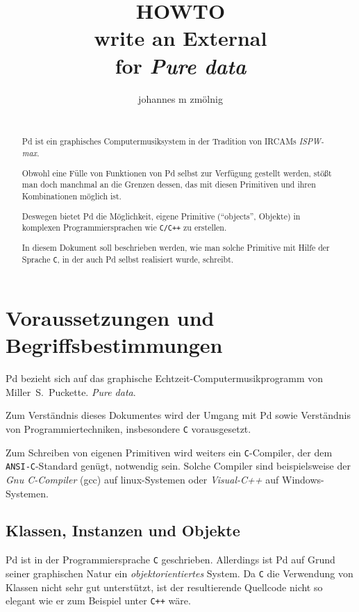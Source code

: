 \documentclass[12pt, a4paper,austrian, titlepage]{article}
\title{
HOWTO \\
write an External \\
for {\em Pure data}
}
\author{
johannes m zmölnig \\
\\
{\em
\latexhtml{institut für elektronische musik und akustik}
{\htmladdnormalink{institut für elektronische musik und akustik}{http://iem.at}}
}
}
\date{}
\begin{document}
\maketitle


\begin{abstract}
Pd ist ein graphisches Computermusiksystem in der Tradition von IRCAMs {\em ISPW-max}.

Obwohl eine Fülle von Funktionen von Pd selbst zur Verfügung gestellt 
werden, stößt man doch manchmal an die Grenzen dessen,
das mit diesen Primitiven und ihren Kombinationen möglich ist.

Deswegen bietet Pd die Möglichkeit, eigene Primitive (``objects'', Objekte) in komplexen
Programmiersprachen wie {\tt C/C++} zu erstellen.

In diesem Dokument soll beschrieben werden, wie man solche Primitive mit Hilfe der 
Sprache {\tt C}, in der auch Pd selbst realisiert wurde, schreibt.
\end{abstract}


\vfill
\newpage

\tableofcontents

\vfill
\newpage

\section{Voraussetzungen und Begriffsbestimmungen}

Pd bezieht sich auf das graphische Echtzeit-Computermusikprogramm von
Miller~S.~Puckette.
{\em Pure data}.

Zum Verständnis dieses Dokumentes wird der Umgang mit Pd sowie
Verständnis von Programmiertechniken, insbesondere {\tt C} vorausgesetzt.

Zum Schreiben von eigenen Primitiven wird weiters ein {\tt C}-Compiler,
der dem {\tt ANSI-C}-Standard genügt, notwendig sein.
Solche Compiler sind beispielsweise der {\em Gnu C-Compiler} (gcc) auf linux-Systemen oder
{\em Visual-C++} auf Windows-Systemen.

\subsection{Klassen, Instanzen und Objekte}
Pd ist in der Programmiersprache {\tt C} geschrieben.
Allerdings ist Pd auf Grund seiner graphischen Natur ein {\em objektorientiertes} System.
Da {\tt C} die Verwendung von Klassen nicht sehr gut unterstützt, ist der resultierende
Quellcode nicht so elegant wie er zum Beispiel unter {\tt C++} wäre.
\end{document}
